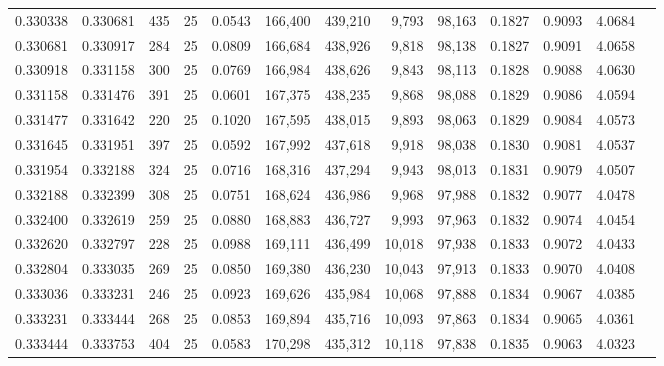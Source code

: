\begin{tabular}{rrrrrrrrrrrrr}
0.330338 & 0.330681 &   435 &  25 &                                     0.0543 & 166,400 & 439,210 &   9,793 &  98,163 & 0.1827 & 0.9093 & 4.0684 \\
0.330681 & 0.330917 &   284 &  25 &                                     0.0809 & 166,684 & 438,926 &   9,818 &  98,138 & 0.1827 & 0.9091 & 4.0658 \\
0.330918 & 0.331158 &   300 &  25 &                                     0.0769 & 166,984 & 438,626 &   9,843 &  98,113 & 0.1828 & 0.9088 & 4.0630 \\
0.331158 & 0.331476 &   391 &  25 &                                     0.0601 & 167,375 & 438,235 &   9,868 &  98,088 & 0.1829 & 0.9086 & 4.0594 \\
0.331477 & 0.331642 &   220 &  25 &                                     0.1020 & 167,595 & 438,015 &   9,893 &  98,063 & 0.1829 & 0.9084 & 4.0573 \\
0.331645 & 0.331951 &   397 &  25 &                                     0.0592 & 167,992 & 437,618 &   9,918 &  98,038 & 0.1830 & 0.9081 & 4.0537 \\
0.331954 & 0.332188 &   324 &  25 &                                     0.0716 & 168,316 & 437,294 &   9,943 &  98,013 & 0.1831 & 0.9079 & 4.0507 \\
0.332188 & 0.332399 &   308 &  25 &                                     0.0751 & 168,624 & 436,986 &   9,968 &  97,988 & 0.1832 & 0.9077 & 4.0478 \\
0.332400 & 0.332619 &   259 &  25 &                                     0.0880 & 168,883 & 436,727 &   9,993 &  97,963 & 0.1832 & 0.9074 & 4.0454 \\
0.332620 & 0.332797 &   228 &  25 &                                     0.0988 & 169,111 & 436,499 &  10,018 &  97,938 & 0.1833 & 0.9072 & 4.0433 \\
0.332804 & 0.333035 &   269 &  25 &                                     0.0850 & 169,380 & 436,230 &  10,043 &  97,913 & 0.1833 & 0.9070 & 4.0408 \\
0.333036 & 0.333231 &   246 &  25 &                                     0.0923 & 169,626 & 435,984 &  10,068 &  97,888 & 0.1834 & 0.9067 & 4.0385 \\
0.333231 & 0.333444 &   268 &  25 &                                     0.0853 & 169,894 & 435,716 &  10,093 &  97,863 & 0.1834 & 0.9065 & 4.0361 \\
0.333444 & 0.333753 &   404 &  25 &                                     0.0583 & 170,298 & 435,312 &  10,118 &  97,838 & 0.1835 & 0.9063 & 4.0323 \\

\end{tabular}
